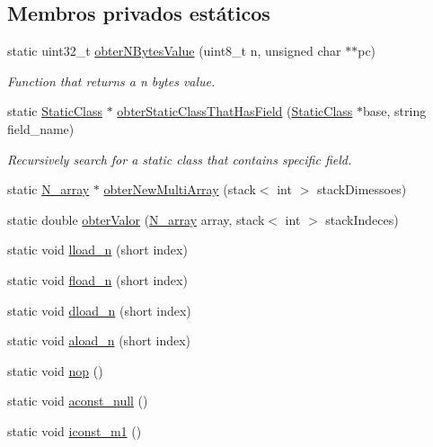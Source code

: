 \subsection*{Membros privados estáticos}
\begin{DoxyCompactItemize}
\item 
static uint32\+\_\+t \hyperlink{classOperations_a6906050cc72d774f77d8ba33607b1c62}{obter\+N\+Bytes\+Value} (uint8\+\_\+t n, unsigned char $\ast$$\ast$pc)
\begin{DoxyCompactList}\small\item\em Function that returns a n bytes value. \end{DoxyCompactList}\item 
static \hyperlink{classStaticClass}{Static\+Class} $\ast$ \hyperlink{classOperations_a2e9f822a1a6b9b0fb374eafb5a55f9f4}{obter\+Static\+Class\+That\+Has\+Field} (\hyperlink{classStaticClass}{Static\+Class} $\ast$base, string field\+\_\+name)
\begin{DoxyCompactList}\small\item\em Recursively search for a static class that contains specific field. \end{DoxyCompactList}\item 
static \hyperlink{structN__array}{N\+\_\+array} $\ast$ \hyperlink{classOperations_a944d6dd757fad81e350513415aaa0c72}{obter\+New\+Multi\+Array} (stack$<$ int $>$ stack\+Dimessoes)
\item 
static double \hyperlink{classOperations_a926006a1873abe481d6877428355fdf2}{obter\+Valor} (\hyperlink{structN__array}{N\+\_\+array} array, stack$<$ int $>$ stack\+Indeces)
\item 
static void \hyperlink{classOperations_a4f70442aed776d9ccae4dfd379715cd4}{lload\+\_\+n} (short index)
\item 
static void \hyperlink{classOperations_af466511fbbf8fd71f6dd31b0433df181}{fload\+\_\+n} (short index)
\item 
static void \hyperlink{classOperations_a44536bc4112eb4eebe23ff85e9b7d02b}{dload\+\_\+n} (short index)
\item 
static void \hyperlink{classOperations_ad148cdfeb25166f5c097cee60ea36325}{aload\+\_\+n} (short index)
\item 
static void \hyperlink{classOperations_a3426eecc1b88f11cc8317f99d430a201}{nop} ()
\item 
static void \hyperlink{classOperations_af51ec8a98d9ed3167da0d8ac6279a1cd}{aconst\+\_\+null} ()
\item 
static void \hyperlink{classOperations_abb57552d42047d4b685b2d68db6b1fd7}{iconst\+\_\+m1} ()
$$
\end{DoxyCompactItemize}
